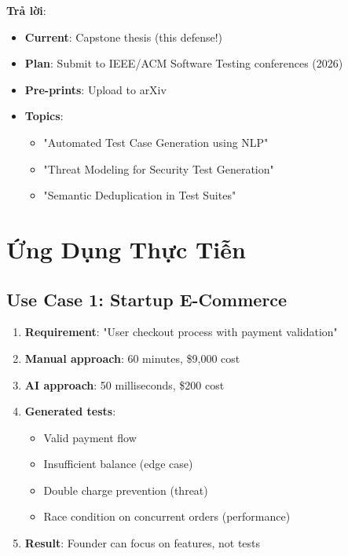 \documentclass[12pt,a4paper]{report}
\begin{document}
\textbf{Trả lời}:
\begin{itemize}
    \item \textbf{Current}: Capstone thesis (this defense!)
    \item \textbf{Plan}: Submit to IEEE/ACM Software Testing conferences (2026)
    \item \textbf{Pre-prints}: Upload to arXiv
    \item \textbf{Topics}: 
    \begin{itemize}
        \item "Automated Test Case Generation using NLP"
        \item "Threat Modeling for Security Test Generation"
        \item "Semantic Deduplication in Test Suites"
    \end{itemize}
\end{itemize}

\chapter{Ứng Dụng Thực Tiễn}

\section{Use Case 1: Startup E-Commerce}

\begin{enumerate}
    \item \textbf{Requirement}: "User checkout process with payment validation"
    \item \textbf{Manual approach}: 60 minutes, \$9,000 cost
    \item \textbf{AI approach}: 50 milliseconds, \$200 cost
    \item \textbf{Generated tests}:
    \begin{itemize}
        \item Valid payment flow
        \item Insufficient balance (edge case)
        \item Double charge prevention (threat)
        \item Race condition on concurrent orders (performance)
    \end{itemize}
    \item \textbf{Result}: Founder can focus on features, not tests
\end{enumerate}
\end{document}
